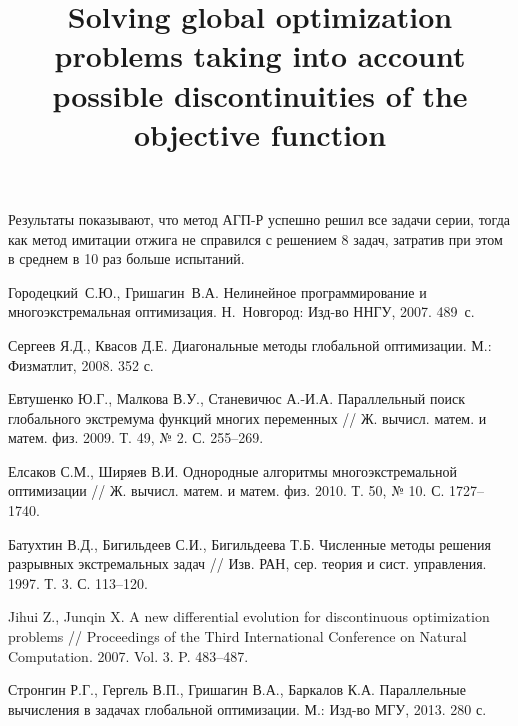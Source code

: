 \documentclass[11pt, oneside, a4paper]{article}
\begin{document}
Результаты показывают, что метод АГП-Р успешно решил все задачи серии, тогда как метод имитации отжига не справился с решением 8 задач, затратив при этом в среднем в 10 раз больше испытаний.


\begin{biblio}






Городецкий~С.Ю., Гришагин~В.А. Нелинейное программирование и многоэкстремальная оптимизация. Н.~Новгород: Изд-во ННГУ, 2007. 489~с.

Сергеев Я.Д., Квасов Д.Е. Диагональные методы глобальной оптимизации. М.: Физматлит, 2008. 352 с. 

Евтушенко Ю.Г., Малкова В.У., Станевичюс А.-И.А. Параллельный поиск глобального экстремума функций многих переменных // Ж. вычисл. матем. и матем. физ. 2009. Т. 49, № 2.  С. 255--269.

Елсаков С.М., Ширяев В.И. Однородные алгоритмы многоэкстремальной оптимизации // Ж. вычисл. матем. и матем. физ. 2010. Т. 50, № 10. С. 1727--1740.

Батухтин В.Д., Бигильдеев С.И., Бигильдеева Т.Б. Численные методы решения разрывных экстремальных задач // Изв. РАН, сер. теория и сист. управления. 1997. Т. 3. С. 113--120.

Jihui Z., Junqin X. A new differential evolution for discontinuous optimization problems // 
Proceedings of the Third International Conference on Natural Computation. 2007. Vol. 3. P. 483--487.

Стронгин Р.Г., Гергель В.П., Гришагин В.А., Баркалов К.А. Параллельные вычисления в задачах глобальной оптимизации. М.: Изд-во МГУ, 2013. 280 с.




\end{biblio}


\title{Solving global optimization problems taking into account possible discontinuities of the objective function}

\end{document}
